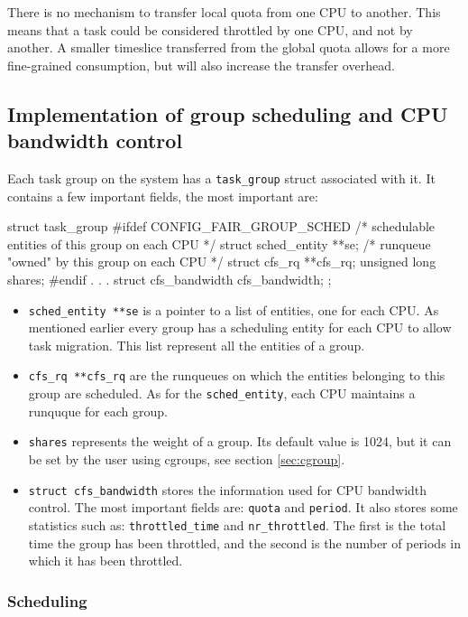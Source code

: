There is no mechanism to transfer local quota from one CPU to another. This means that a task could be considered throttled by one CPU, and not by another. A smaller timeslice transferred from the global quota allows for a more fine-grained consumption, but will also increase the transfer overhead. %

\subsection{Implementation of group scheduling and CPU bandwidth control}
\label{sec:group_sched_impl}

Each task group on the system has a \verb|task_group| struct associated with it. It contains a few important fields, the most important are:
\begin{code}
struct task_group {
	#ifdef CONFIG_FAIR_GROUP_SCHED
	/* schedulable entities of this group on each CPU */
	struct sched_entity	**se;
	/* runqueue "owned" by this group on each CPU */
	struct cfs_rq		**cfs_rq;
	unsigned long		shares;
	#endif
	.
	.
	.
	struct cfs_bandwidth	cfs_bandwidth;
};
\end{code}

\begin{itemize}
    \item \verb|sched_entity **se| is a pointer to a list of entities, one for each CPU. As mentioned earlier every group has a scheduling entity for each CPU to allow task migration. This list represent all the entities of a group.
    \item \verb|cfs_rq **cfs_rq| are the runqueues on which the entities belonging to this group are scheduled. As for the \verb|sched_entity|, each CPU maintains a runquque for each group.
    \item \verb|shares| represents the weight of a group. Its default value is 1024, but it can be set by the user using cgroups, see section \ref{sec:cgroup}.
    \item \verb|struct cfs_bandwidth| stores the information used for CPU bandwidth control. The most important fields are: \verb|quota| and \verb|period|. It also stores some statistics such as: \verb|throttled_time| and \verb|nr_throttled|. The first is the total time the group has been throttled, and the second is the number of periods in which it has been throttled.
\end{itemize}

\subsubsection{Scheduling}

